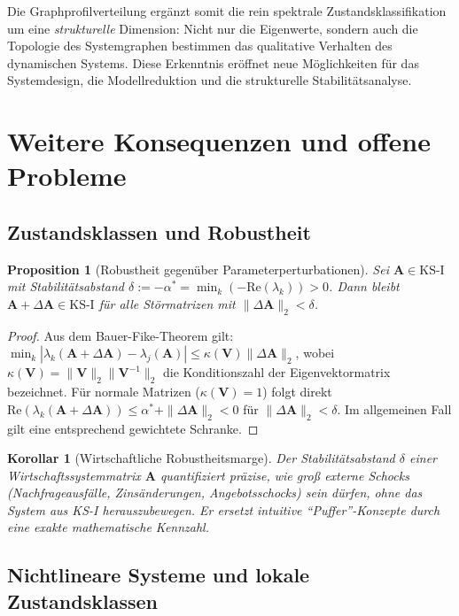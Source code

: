 \documentclass[a4paper, 12pt, twoside, openright]{report}
\newtheorem{proposition}[theorem]{Proposition}
\newtheorem{corollary}[theorem]{Korollar}
\theoremstyle{definition}
\theoremstyle{definition}
\newcommand{\vA}{\bm{A}}
\newcommand{\vV}{\bm{V}}
\newcommand{\re}{\mathrm{Re}}
\newcommand{\KS}{\mathrm{KS}}
\begin{document}
Die Graphprofilverteilung ergänzt somit die rein spektrale Zustandsklassifikation
um eine \emph{strukturelle} Dimension: Nicht nur die Eigenwerte, sondern auch die
Topologie des Systemgraphen bestimmen das qualitative Verhalten des dynamischen Systems.
Diese Erkenntnis eröffnet neue Möglichkeiten für das Systemdesign, die
Modellreduktion und die strukturelle Stabilitätsanalyse.

\section{Weitere Konsequenzen und offene Probleme}
\label{sec:konsequenzen}

\subsection{Zustandsklassen und Robustheit}

\begin{proposition}[Robustheit gegenüber Parameterperturbationen]
\label{prop:robustheit}
Sei $\vA \in \KS\text{-I}$ mit Stabilitätsabstand
$\delta := -\alpha^* = \min_k(-\re(\lambda_k)) > 0$. Dann bleibt $\vA + \Delta\vA \in \KS\text{-I}$
für alle Störmatrizen mit $\|\Delta\vA\|_2 < \delta$.
\end{proposition}

\begin{proof}
Aus dem Bauer-Fike-Theorem gilt: $\min_{k}|\lambda_k(\vA+\Delta\vA) - \lambda_j(\vA)| \leq \kappa(\vV)\|\Delta\vA\|_2$,
wobei $\kappa(\vV) = \|\vV\|_2\|\vV^{-1}\|_2$ die Konditionszahl der Eigenvektormatrix
bezeichnet. Für normale Matrizen ($\kappa(\vV)=1$) folgt direkt
$\re(\lambda_k(\vA+\Delta\vA)) \leq \alpha^* + \|\Delta\vA\|_2 < 0$
für $\|\Delta\vA\|_2 < \delta$. Im allgemeinen Fall gilt eine entsprechend gewichtete
Schranke. \qedhere
\end{proof}

\begin{corollary}[Wirtschaftliche Robustheitsmarge]
Der Stabilitätsabstand $\delta$ einer Wirtschaftssystemmatrix $\vA$ quantifiziert
präzise, wie groß externe Schocks (Nachfrageausfälle, Zinsänderungen, Angebotsschocks)
sein dürfen, ohne das System aus KS-I herauszubewegen. Er ersetzt intuitive
``Puffer''-Konzepte durch eine exakte mathematische Kennzahl.
\end{corollary}

\subsection{Nichtlineare Systeme und lokale Zustandsklassen}
\end{document}
